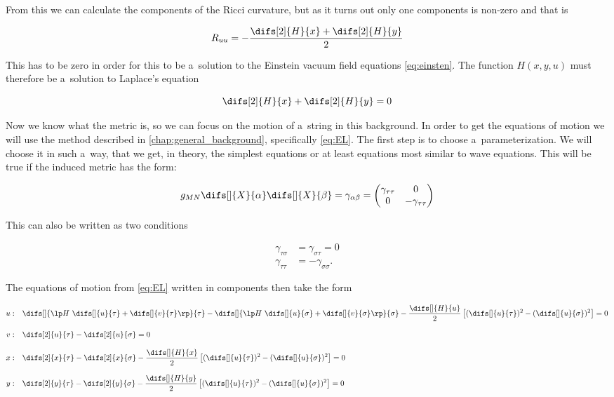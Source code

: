 \noindent
From this we can calculate the components of the Ricci curvature, but as it turns out only one components is non-zero and that is

\begin{equation}
    R_{uu} = - \frac{\difs[2]{H}{x} + \difs[2]{H}{y}}{2}
\end{equation}

\noindent
This has to be zero in order for this to be a~solution to the Einstein vacuum field equations \eqref{eq:einsten}. The function $H(x, y, u)$ must therefore be a~solution to Laplace's equation

\begin{equation}    \label{eq:grav_laplace_H}
    \difs[2]{H}{x} + \difs[2]{H}{y} = 0
\end{equation}

\noindent
Now we know what the metric is, so we can focus on the motion of a~string in this background. In order to get the equations of motion we will use the method described in \cref{chap:general_background}, specifically \cref{eq:EL}. The first step is to choose a~parameterization. We will choose it in such a~way, that we get, in theory, the simplest equations or at least equations most similar to wave equations. This will be true if the induced metric has the form:

\begin{equation}
    g_{MN} \difs[]{X}{\alpha} \difs[]{X}{\beta} = \gamma_{\alpha \beta} = 
    \begin{pmatrix}
        \gamma_{\tau \tau} & 0 \\
        0 & -\gamma_{\tau \tau}
    \end{pmatrix}
\end{equation}

\noindent
This can also be written as two conditions

\begin{equation}\label{eq:gamma_cond}
    \begin{aligned}
        \gamma_{\tau \sigma} &= \gamma_{\sigma \tau} = 0\\
        \gamma_{\tau \tau} &= -\gamma_{\sigma \sigma}.
    \end{aligned}
\end{equation}

\noindent 
The equations of motion from \cref{eq:EL} written in components then take the form

\begin{align}
    u: & \quad \difs[]{\lp H~\difs[]{u}{\tau} + \difs[]{v}{\tau} \rp}{\tau} - \difs[]{\lp H~\difs[]{u}{\sigma} + \difs[]{v}{\sigma} \rp}{\sigma} - \frac{\difs[]{H}{u}}{2} \left[ (\difs[]{u}{\tau})^2 - (\difs[]{u}{\sigma})^2 \right] = 0\\[3mm]
    \label{eq:grav_v}    v: & \quad \difs[2]{u}{\tau} - \difs[2]{u}{\sigma} = 0 \\[3mm]
    x: & \quad \difs[2]{x}{\tau} - \difs[2]{x}{\sigma} - \frac{\difs[]{H}{x}}{2} \left[ (\difs[]{u}{\tau})^2 - (\difs[]{u}{\sigma})^2 \right] = 0 \\[3mm]
    y: & \quad \difs[2]{y}{\tau} - \difs[2]{y}{\sigma} - \frac{\difs[]{H}{y}}{2} \left[ (\difs[]{u}{\tau})^2 - (\difs[]{u}{\sigma})^2 \right] = 0
\end{align}

